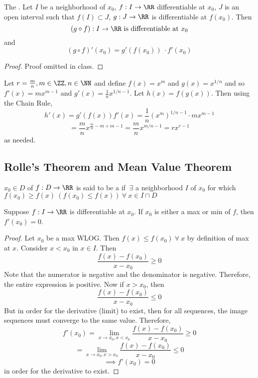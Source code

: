 \documentclass[12pt]{scrartcl}
\begin{document}
\begin{theorem}
  The . Let $I$ be a neighborhood of $x_0$, 
  $f: I \to \RR$ differentiable at $x_0$, $J$ is an open interval such that 
  $f(I) \subset J$, $g: J \to \RR$ is differentiable at $f(x_0)$. Then 
  \[(g \circ f): I \to \RR \text{ is differentiable at } x_0\] and 
  \[(g \circ f)'(x_0) = g'(f(x_0))\ \cdot f'(x_0)\]
  \begin{proof}
    Proof omitted in class.
  \end{proof}
\end{theorem}

\begin{example}
  Let $r = \frac{m}{n}, m \in \ZZ, n \in \NN$ and define 
  $f(x) = x^m$ and $g(x) = x^{1/n}$ and so 
  $f'(x) = mx^{m-1}$ and $g'(x) = \frac{1}{n}x^{1/n - 1}$. Let 
  $h(x) = f(g(x))$. Then using the Chain Rule, 
  \[h'(x) = g'(f(x))f'(x) = \frac{1}{n}(x^m)^{1/n - 1} \cdot mx^{m-1}\]
  \[= \frac{m}{n}x^{\frac{m}{n} - m + m - 1} = \frac{m}{n}x^{m/n - 1} = rx^{r- 1}\]
  as needed.
\end{example}

\subsection{Rolle's Theorem and Mean Value Theorem}

\begin{definition}
  $x_0 \in D$ of $f: D \to \RR$ is said to be a  if $\ \exists$ a neighborhood 
  $I$ of $x_0$ for which $f(x_0) \geq f(x) \ (f(x_0) \leq f(x)) \ \forall \ x \in I \cap D$
\end{definition}

\begin{lemma}
  Suppose $f: I \to \RR$ is differentiable at $x_0$. If 
  $x_0$ is either a max or min of $f$, then $f'(x_0) = 0$. 

  \begin{proof}
    Let $x_0$ be a max WLOG. Then $f(x) \leq f(x_0) \ \forall \ x$ by 
    definition of max at $x$. Consider $x < x_0$ in $x \in I$. Then 
    \[\frac{f(x) - f(x_0)}{x-x_0} \geq 0\]
    Note that the numerator is negative and the denominator is negative. Therefore, the entire 
    expression is positive. Now if $x > x_0$, then 
    \[\frac{f(x) - f(x_0)}{x-x_0} \leq 0\]
    But in order for the derivative (limit) to exist, then for all 
    sequences, the image sequences must converge to the same value. Therefore, 
    \[f'(x_0) = \lim_{x\to x_0, x < x_0} \frac{f(x) - f(x_0)}{x-x_0} \geq 0\]
    \[ = \lim_{x\to x_0, x > x_0} \frac{f(x) - f(x_0)}{x -x_0} \leq 0\]
    \[\implies f'(x_0) = 0\]
    in order for the derivative to exist.
  \end{proof}
\end{lemma}
\end{document}
